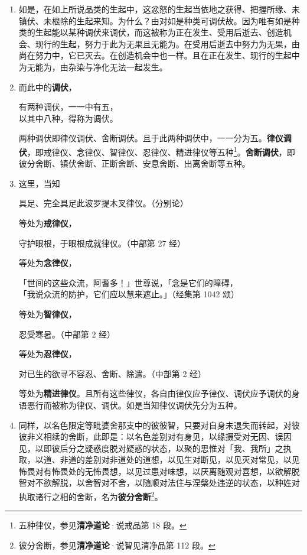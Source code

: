 \begin{enumerate}
\item 如是，在如上所说品类的生起中，这忿怒的生起当依地之获得、把握所缘、未镇伏、未根除的生起来知。为什么？由对如是种类可调伏故。因为唯有如是种类的生起能以某种调伏来调伏，而这被称为正在发生、受用后逝去、创造机会、现行的生起，努力于此为无果且无能为。在受用后逝去中努力为无果，由尚在努力中，它已灭去。在创造机会中也一样。且在正在发生、现行的生起中为无能为，由杂染与净化无法一起发生。
\item 而此中的\textbf{调伏}，\begin{quoting}有两种调伏，一一中有五，\\以其中八种，得称为调伏。\end{quoting}两种调伏即律仪调伏、舍断调伏。且于此两种调伏中，一一分为五。\textbf{律仪调伏}，即戒律仪、念律仪、智律仪、忍律仪、精进律仪等五种\footnote{五种律仪，参见\textbf{清净道论}·说戒品第 18 段。}。\textbf{舍断调伏}，即彼分舍断、镇伏舍断、正断舍断、安息舍断、出离舍断等五种。
\item 这里，当知\begin{quoting}具足、完全具足此波罗提木叉律仪。（分别论）\end{quoting}等处为\textbf{戒律仪}，\begin{quoting}守护眼根，于眼根成就律仪。（中部第 27 经）\end{quoting}等处为\textbf{念律仪}，\begin{quoting}「世间的这些众流，阿耆多！」世尊说，「念是它们的障碍，\\「我说众流的防护，它们应以慧来遮止。」（经集第 1042 颂）\end{quoting}等处为\textbf{智律仪}，\begin{quoting}忍受寒暑。（中部第 2 经）\end{quoting}等处为\textbf{忍律仪}，\begin{quoting}对已生的欲寻不容忍、舍断、除遣。（中部第 2 经）\end{quoting}等处为\textbf{精进律仪}。且所有这些律仪，各自由律仪应予律仪、调伏应予调伏的身语恶行而被称为律仪、调伏。如是当知律仪调伏先分为五种。
\item 同样，以名色限定等毗婆舍那支中的彼彼智，只要对自身未退失而转起，对彼彼非义相续的舍断，此即是：以名色差别对有身见，以缘摄受对无因、误因见，以即彼后分之疑惑度脱对疑惑的状态，以聚的思惟对「我、我所」之执取，以道、非道的差别对非道处的道想，以见生对断见，以见灭对常见，以见怖畏对有怖畏处的无怖畏想，以见过患对味想，以厌离随观对喜想，以欲解脱智对不欲解脱，以舍智对不舍，以随顺对法住与涅槃处违逆的状态，以种姓对执取诸行之相的舍断，名为\textbf{彼分舍断}\footnote{彼分舍断，参见\textbf{清净道论}·说智见清净品第 112 段。}。

\end{enumerate}
